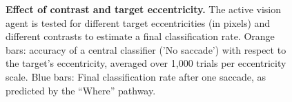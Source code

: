\begin{figure}[t!]%
	\caption{
		{\bf Effect of contrast and target eccentricity.} %
		The active vision agent is tested for different target eccentricities (in pixels) and different contrasts to estimate a final classification rate. Orange bars: accuracy of a central classifier ('No saccade') with respect to the target's eccentricity, averaged over 1,000 trials per eccentricity scale. Blue bars: Final classification rate after one saccade, as predicted by the ``Where'' pathway. %
		\label{fig:results}}%
\end{figure}%




